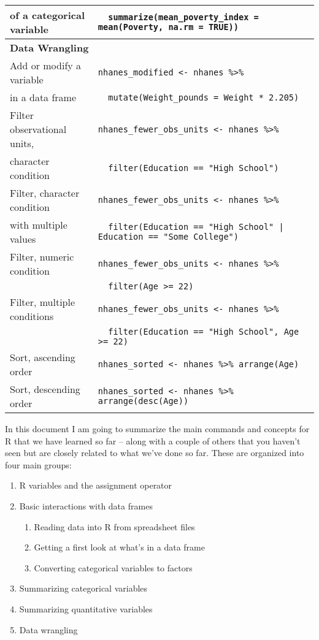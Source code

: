 \documentclass[]{article}
\providecommand{\tightlist}{%
  \setlength{\itemsep}{0pt}\setlength{\parskip}{0pt}}
\begin{document}
\begin{table}[!h]
\begin{tabular}{p{4.25cm} p{12.5cm}}
of a categorical variable & \verb&  summarize(mean_poverty_index = mean(Poverty, na.rm = TRUE))& \\
\midrule
\multicolumn{2}{l}{\textbf{Data Wrangling}} \\
\midrule
Add or modify a variable & \verb&nhanes_modified <- nhanes %>%& \\
in a data frame & \verb&  mutate(Weight_pounds = Weight * 2.205)& \\
\midrule
Filter observational units, & \verb&nhanes_fewer_obs_units <- nhanes %>%& \\
character condition & \verb&  filter(Education == "High School")& \\
\midrule
Filter, character condition & \verb&nhanes_fewer_obs_units <- nhanes %>%& \\
with multiple values & \verb&  filter(Education == "High School" | Education == "Some College") & \\
\midrule
Filter, numeric condition & \verb&nhanes_fewer_obs_units <- nhanes %>%& \\
 & \verb&  filter(Age >= 22)& \\
\midrule
Filter, multiple conditions & \verb&nhanes_fewer_obs_units <- nhanes %>%& \\
 & \verb&  filter(Education == "High School", Age >= 22)& \\
\midrule
Sort, ascending order & \verb&nhanes_sorted <- nhanes %>% arrange(Age)& \\
\midrule
Sort, descending order & \verb&nhanes_sorted <- nhanes %>% arrange(desc(Age))& \\
\bottomrule
\end{tabular}
\end{table}

\newpage

In this document I am going to summarize the main commands and concepts
for R that we have learned so far -- along with a couple of others that
you haven't seen but are closely related to what we've done so far.
These are organized into four main groups:

\begin{enumerate}
\def\labelenumi{\arabic{enumi}.}
\tightlist
\item
  R variables and the assignment operator
\item
  Basic interactions with data frames

  \begin{enumerate}
  \def\labelenumii{\alph{enumii}.}
  \tightlist
  \item
    Reading data into R from spreadsheet files
  \item
    Getting a first look at what's in a data frame
  \item
    Converting categorical variables to factors
  \end{enumerate}
\item
  Summarizing categorical variables
\item
  Summarizing quantitative variables
\item
  Data wrangling
\end{enumerate}
\end{document}
